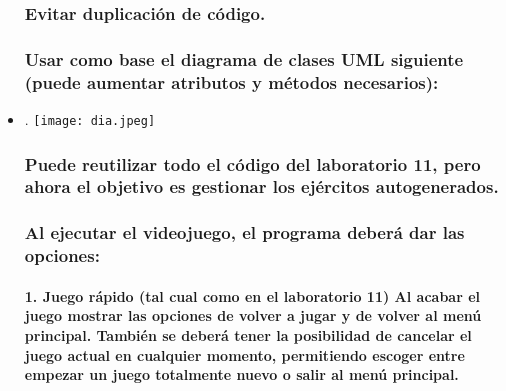 \documentclass{article}
\begin{document}
\begin{itemize}
        \subsubsection {Evitar duplicación de código.}
        \subsubsection {Usar como base el diagrama de clases UML siguiente (puede aumentar atributos y métodos necesarios):}
        \item .
        \texttt{[image: dia.jpeg]}
        \subsubsection {Puede reutilizar todo el código del laboratorio 11, pero ahora el objetivo es gestionar los ejércitos autogenerados.}
        \subsubsection {Al ejecutar el videojuego, el programa deberá dar las opciones:}
        \paragraph {1. Juego rápido (tal cual como en el laboratorio 11) Al acabar el juego mostrar las opciones de volver a jugar y de volver al menú principal. También se deberá tener la posibilidad de cancelar el juego actual en cualquier momento, permitiendo escoger entre empezar un juego totalmente nuevo o salir al menú principal.}

\end{itemize}
\end{document}
